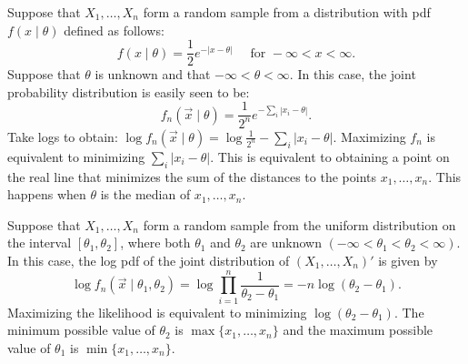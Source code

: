 \begin{example}
Suppose that $X_1, \ldots, X_n$ form a random sample from a distribution with 
pdf $f(x \mid \theta)$ defined as follows:
\[
    f(x \mid \theta) = \frac{1}{2} e^{- |x - \theta|} 
        \quad \text{ for } -\infty < x < \infty.
\]
Suppose that $\theta$ is unknown and that $-\infty < \theta < \infty$. 
In this case, the joint probability distribution is easily seen to be:
\[
    f_n(\vec{x} \mid \theta) = \frac{1}{2^n} e^{- \sum_i |x_i - \theta|}.
\]
Take logs to obtain: 
$\log f_n (\vec{x} \mid \theta) = \log \frac{1}{2^n} - \sum_i |x_i - \theta|$. 
Maximizing $f_n$ is equivalent to minimizing $\sum_i |x_i - \theta|$. This 
is equivalent to obtaining a point on the real line that minimizes the sum 
of the distances to the points $x_1, \ldots, x_n$. This happens when $\theta$
is the median of $x_1, \ldots, x_n$.
\end{example}

\begin{example}\label{ex:stats:uniform}
Suppose that $X_1, \ldots, X_n$ form a random sample from the uniform distribution
on the interval $[\theta_1, \theta_2]$, where both $\theta_1$ and $\theta_2$ 
are unknown $(-\infty < \theta_1 < \theta_2 < \infty)$. In this case, the 
log pdf of the joint distribution of $(X_1, \ldots, X_n)'$ is given by
\[
    \log f_n (\vec{x} \mid \theta_1, \theta_2) 
    = \log \prod_{i = 1}^n \frac{1}{\theta_2 - \theta_1}    
    = - n \log (\theta_2 - \theta_1).
\]
Maximizing the likelihood is equivalent to minimizing $\log (\theta_2 - \theta_1)$.
The minimum possible value of $\theta_2$ is $\max \{x_1, \ldots, x_n\}$
and the maximum possible value of $\theta_1$ is $\min \{x_1, \ldots, x_n\}$.
\end{example}

